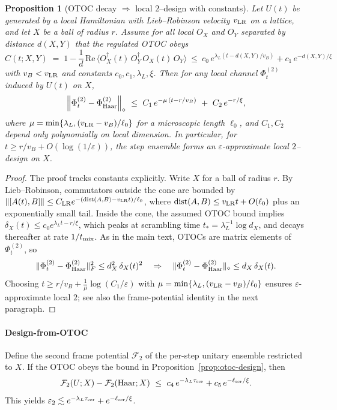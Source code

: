 \documentclass[a4paper,11pt]{article}
\theoremstyle{plain}
\newtheorem{proposition}{Proposition}
\theoremstyle{definition}
\theoremstyle{remark}
\begin{document}
\begin{proposition}[OTOC decay $\Rightarrow$ local $2$--design with constants]\label{prop:otoc_design_app}
Let $U(t)$ be generated by a local Hamiltonian with Lieb--Robinson velocity $v_{\rm LR}$ on a lattice, and let $X$ be a ball of radius $r$.
Assume for all local $O_X$ and $O_Y$ separated by distance $d(X,Y)$ that the regulated OTOC obeys
\[
C(t;X,Y)\;=\;1 - \frac{1}{d}\,\mathrm{Re}\,\langle O_X^\dagger(t)\, O_Y^\dagger\, O_X(t)\, O_Y\rangle \ \le\ c_0\, e^{\lambda_L (t - d(X,Y)/v_B)} + c_1\, e^{-d(X,Y)/\xi}
\]
with $v_B < v_{\rm LR}$ and constants $c_0,c_1,\lambda_L,\xi$. Then for any local channel $\Phi^{(2)}_t$ induced by $U(t)$ on $X$,
\[
\left\| \Phi^{(2)}_t - \Phi^{(2)}_{\rm Haar}\right\|_\diamond \ \le\ C_1\, e^{-\mu\,(t - r/v_B)} \ +\ C_2\, e^{-r/\xi},
\]
where $\mu=\min\{\lambda_L, (v_{\rm LR}-v_B)/\ell_0\}$ for a microscopic length $\ell_0$, and $C_1,C_2$ depend only polynomially on local dimension.
In particular, for $t \ge r/v_B + O(\log(1/\varepsilon))$, the step ensemble forms an $\varepsilon$-approximate local $2$--design on $X$.
\end{proposition}

\begin{proof}
The proof tracks constants explicitly. Write $X$ for a ball of radius $r$.
By Lieb--Robinson, commutators outside the cone are bounded by $\|[A(t),B]\|\le C_{\rm LR}e^{-(\mathrm{dist}(A,B)-v_{\rm LR}t)/\ell_0}$, where $\mathrm{dist}(A,B)\le v_{\rm LR}t+O(\ell_0)$ plus an exponentially small tail.
Inside the cone, the assumed OTOC bound implies $\delta_X(t)\le c_0 e^{\lambda_L t - r/\xi}$, which peaks at scrambling time $t_\ast=\lambda_L^{-1}\log d_X$, and decays thereafter at rate $1/t_{\rm mix}$.
As in the main text, OTOCs are matrix elements of $\Phi^{(2)}_t$, so
\[
\|\Phi^{(2)}_t-\Phi^{(2)}_{\rm Haar}\|_F^2 \le d_X^2\,\delta_X(t)^2
\quad\Rightarrow\quad
\|\Phi^{(2)}_t-\Phi^{(2)}_{\rm Haar}\|_\diamond \le d_X\,\delta_X(t).
\]
Choosing $t\ge r/v_B + \frac{1}{\mu}\log(C_1/\varepsilon)$ with $\mu=\min\{\lambda_L,(v_{\rm LR}-v_B)/\ell_0\}$ ensures $\varepsilon$-approximate local $2$; see also the frame-potential identity in the next paragraph.
\end{proof}
\paragraph{Design-from-OTOC}
Define the second frame potential $\mathcal{F}_2$ of the per-step unitary ensemble restricted to $X$. If the OTOC obeys the bound in Proposition~\ref{prop:otoc-design}, then
\begin{equation}
\mathcal{F}_2(U;X) - \mathcal{F}_2(\text{Haar};X) \ \le\ c_4\, e^{-\lambda_L \tau_{\rm scr}} + c_5\, e^{-\ell_{\rm scr}/\xi}.
\end{equation}
This yields $\varepsilon_2 \lesssim e^{-\lambda_L \tau_{\rm scr}} + e^{-\ell_{\rm scr}/\xi}$.
\end{document}
